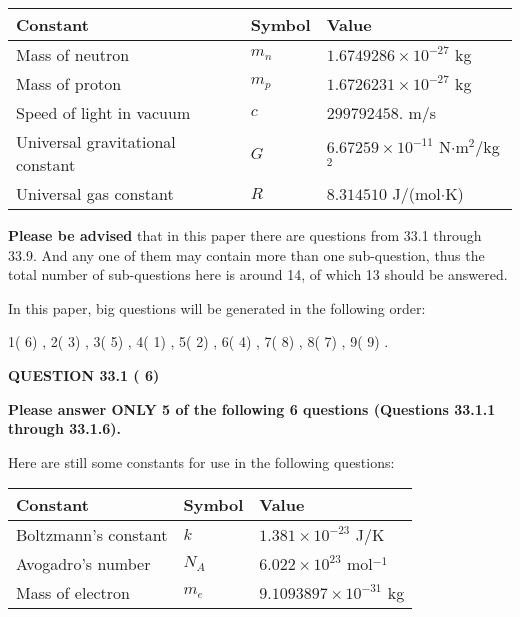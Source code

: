 \documentclass[12pt]{article}
\begin{document}
 
\noindent\begin{tabular}{|l|l|l|}
\hline
Constant & Symbol & Value \\
\hline
Mass of neutron &
$m_n$ &
 $ 1.6749286 \times 10^{-27} $
kg \\
\hline
Mass of proton &
$m_p$ &
 $ 1.6726231 \times 10^{-27} $
kg \\
\hline
Speed of light in vacuum &
$c$ &
 $ 299792458. $
m/s \\
\hline
Universal gravitational constant &
$G$ &
 $ 6.67259 \times 10^{-11} $
N$\cdot $m$^2$/kg$^2$ \\
\hline
Universal gas constant &
$R$ &
 $ 8.314510 $
J/(mol$\cdot $K) \\
\hline
\end{tabular}
 
 
{\textbf{\large{Please be advised}}} that in this paper there are questions from
33.1 through
33.9.
And any one of them may contain more than one sub-question, thus the total number
of sub-questions here is around 14, of which
13 should be answered.
 
\vspace{0.3in}
 
 
   
   
   
\vspace{0.2in}
   
In this paper, big questions will be generated in the following order: 
   
   
            1(          6)
 ,
            2(          3)
 ,
            3(          5)
 ,
            4(          1)
 ,
            5(          2)
 ,
            6(          4)
 ,
            7(          8)
 ,
            8(          7)
 ,
            9(          9)
 .
  
\vspace{0.2in}
  
{\textbf{\Large{QUESTION
33.1 
 (          6)
}}}
  
  
 
{\textbf{\Large{Please answer ONLY
5 of the following
6 questions (Questions
33.1.1 through
33.1.6). }}}
 
Here are still some constants for use in the following questions:
 
 
\noindent\begin{tabular}{|l|l|l|}
\hline
Constant & Symbol & Value \\
\hline
 
Boltzmann's constant &
$k$ &
 $ 1.381 \times 10^{-23} $
J/K \\
\hline
 
Avogadro's number &
$N_A$ &
 $ 6.022 \times 10^{23} $
mol$^{-1}$ \\
\hline
 
Mass of electron &
$m_e$ &
 $ 9.1093897 \times 10^{-31} $
kg \\
\hline
 
\end{tabular}
 
\end{document}
